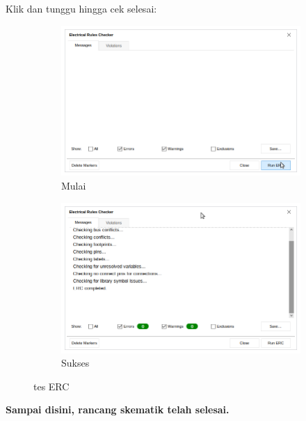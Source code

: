 \documentclass[12pt]{book}
\begin{document}
	Klik  dan tunggu hingga cek selesai:
	\begin{figure}[!ht]
		\centering
		\begin{subfigure}[t]{0.45\textwidth}
			\includegraphics[width=\textwidth]{images/sch/erc_0}
			\caption{Mulai}
		\end{subfigure}
		\begin{subfigure}[t]{0.45\textwidth}
			\includegraphics[width=\textwidth]{images/sch/erc_1}
			\caption{Sukses}
		\end{subfigure}
		\caption{tes ERC}
	\end{figure}

	\begin{center}
		\textbf{Sampai disini, rancang skematik telah selesai.}
	\end{center}
\end{document}

